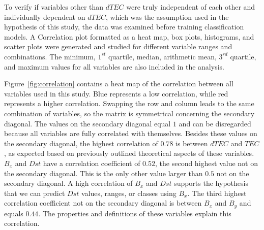 \documentclass[sn-mathphys-num]{sn-jnl}%
\begin{document}
To verify if variables other than $dTEC$ were truly independent of each other and individually dependent on $dTEC$, which was the assumption used in the hypothesis of this study, the data was examined before training classification models. A Correlation plot formatted as a heat map, box plots, histograms, and scatter plots were generated and studied for different variable ranges and combinations. The minimum, $1^{st}$ quartile, median, arithmetic mean, $3^{rd}$ quartile, and maximum values for all variables are also included in the analysis.

Figure~\ref{fig:correlation} contains a heat map of the correlation between all variables used in this study. Blue represents a low correlation, while red represents a higher correlation. Swapping the row and column leads to the same combination of variables, so the matrix is symmetrical concerning the secondary diagonal. The values on the secondary diagonal equal $1$ and can be disregarded because all variables are fully correlated with themselves. Besides these values on the secondary diagonal, the highest correlation of $0.78$ is between $dTEC$ and $TEC$, as expected based on previously outlined theoretical aspects of these variables. $B_{x}$ and $Dst$ have a correlation coefficient of $0.52$, the second highest value not on the secondary diagonal. This is the only other value larger than $0.5$ not on the secondary diagonal. A high correlation of $B_{x}$ and $Dst$ supports the hypothesis that we can predict $Dst$ values, ranges, or classes using $B_{x}$. The third highest correlation coefficient not on the secondary diagonal is between $B_{x}$ and $B_{y}$ and equals $0.44$. The properties and definitions of these variables explain this correlation.
\end{document}
